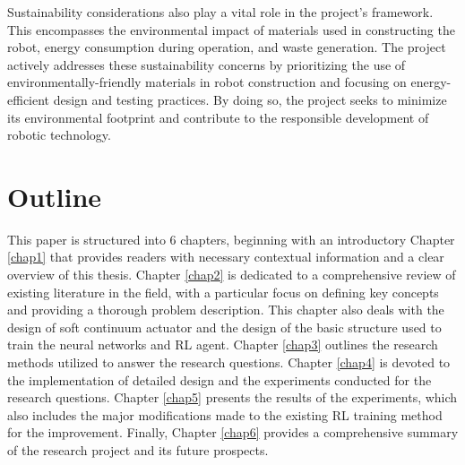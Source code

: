 Sustainability considerations also play a vital role in the project's framework. This encompasses the environmental impact of materials used in constructing the robot, energy consumption during operation, and waste generation. The project actively addresses these sustainability concerns by prioritizing the use of environmentally-friendly materials in robot construction and focusing on energy-efficient design and testing practices. By doing so, the project seeks to minimize its environmental footprint and contribute to the responsible development of robotic technology.

\section{Outline}
This paper is structured into 6 chapters, beginning with an introductory Chapter \ref{chap1} that provides readers with necessary contextual information and a clear overview of this thesis. Chapter \ref{chap2} is dedicated to a comprehensive review of existing literature in the field, with a particular focus on defining key concepts and providing a thorough problem description. This chapter also deals with the design of soft continuum actuator and the design of the basic structure used to train the neural networks and \ac{RL} agent. Chapter \ref{chap3} outlines the research methods utilized to answer the research questions. Chapter \ref{chap4} is devoted to the implementation of detailed design and the experiments conducted for the research questions. Chapter \ref{chap5} presents the results of the experiments, which also includes the major modifications made to the existing \ac{RL} training method for the improvement. Finally, Chapter \ref{chap6} provides a comprehensive summary of the research project and its future prospects.
